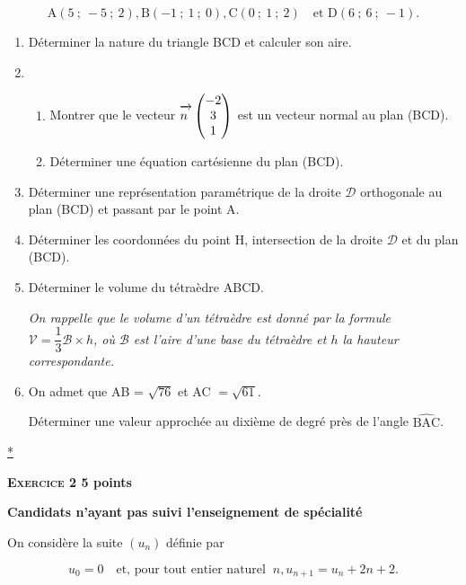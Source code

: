 \documentclass[10pt]{article}
\newcommand{\vect}[1]{\mathchoice%
{\overrightarrow{\displaystyle\mathstrut#1\,\,}}%
{\overrightarrow{\textstyle\mathstrut#1\,\,}}%
{\overrightarrow{\scriptstyle\mathstrut#1\,\,}}%
{\overrightarrow{\scriptscriptstyle\mathstrut#1\,\,}}}
\begin{document}
\[\text{A}(5~;~-5~;~2), \text{B} (-1~;~1~;~0), \text{C}(0~;~1~;~2)\quad  \text{et D}(6~;~6~;~-1).\]
 
\begin{enumerate}
\item Déterminer la nature du triangle BCD et calculer son aire. 
\item 
	\begin{enumerate}
		\item Montrer que le vecteur $\vect{n}\begin{pmatrix}- 2\\3\\1\end{pmatrix}$  est un vecteur normal au plan (BCD). 
		\item Déterminer une équation cartésienne du plan (BCD).
	\end{enumerate} 
\item Déterminer une représentation paramétrique de la droite $\mathcal{D}$ orthogonale au plan (BCD) et passant par le point A. 
\item Déterminer les coordonnées du point H, intersection de la droite $\mathcal{D}$ et du plan (BCD). 
\item Déterminer le volume du tétraèdre ABCD. 

\emph{On rappelle que le volume d'un tétraèdre est donné par la formule  $\mathcal{V} = \dfrac{1}{3}\mathcal{B} \times  h$, où $\mathcal{B}$ est  
l'aire d'une base du tétraèdre et $h$ la hauteur correspondante.} 
\item On admet que AB = $\sqrt{76}$ et AC $= \sqrt{61}$.
 
Déterminer une valeur approchée au dixième de degré près de l'angle 
$\widehat{\text{BAC}}$. 
\end{enumerate}

\hyperlink{Index}{*}
\vspace{0,5cm}

\textbf{\textsc{Exercice 2} \hfill 5 points}
 
\textbf{Candidats n'ayant pas suivi l'enseignement de spécialité}

\medskip{}
 
On considère la suite $\left(u_{n}\right)$ définie par 

\[u_{0} = 0\quad  \text{et, pour tout entier naturel }\:n, u_{n+1} = u_{n} + 2n + 2.\]
 
\end{document}
